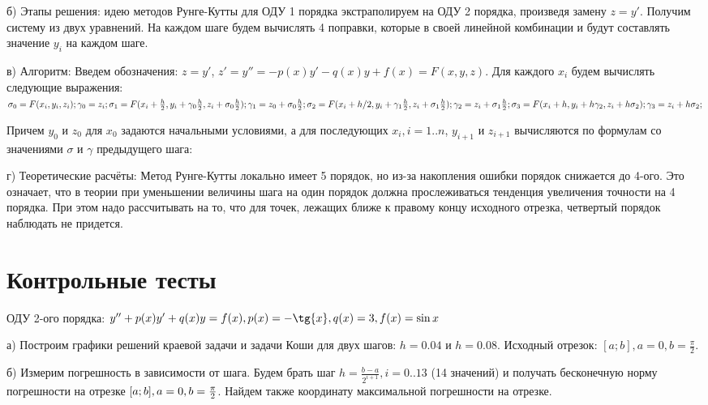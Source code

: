 \documentclass{article}
\begin{document}
	
	б) Этапы решения: идею методов Рунге-Кутты для ОДУ 1 порядка экстраполируем на ОДУ 2 порядка, произведя замену $z = y'$. Получим систему из двух уравнений. На каждом шаге будем вычислять 4 поправки, которые в своей линейной комбинации и будут составлять значение $y_i$ на каждом шаге.\par
	в) Алгоритм: Введем обозначения: $z = y'$, $z' = y'' = -p(x)y' - q(x)y + f(x) = F(x, y, z)$. Для каждого $x_i$ будем вычислять следующие выражения:\\
	$       \sigma_0 = F(x_i, y_i, z_i);\\
	\gamma_0 = z_i;\\ \\
	\sigma_1 = F(x_i + \frac{h}{2}, y_i + \gamma_0\frac{h}{2}, z_i + \sigma_0\frac{h}{2});\\
	\gamma_1 = z_0 + \sigma_0\frac{h}{2};\\ \\
	\sigma_2 = F(x_i + h/2, y_i + \gamma_1\frac{h}{2}, z_i + \sigma_1\frac{h}{2});\\
	\gamma_2 = z_i + \sigma_1\frac{h}{2};\\ \\
	\sigma_3 = F(x_i + h, y_i + h\gamma_2, z_i + h\sigma_2);\\
	\gamma_3 = z_i + h\sigma_2;$\par\par
	Причем $y_0$ и $z_0$ для $x_0$ задаются начальными условиями, а для последующих $x_i, i = 1..n$, $y_{i+1}$ и $z_{i+1}$ вычисляются по формулам со значениями $\sigma$ и $\gamma$ предыдущего шага: 

	
	
	г) Теоретические расчёты: Метод Рунге-Кутты локально имеет 5 порядок, но из-за накопления ошибки порядок снижается до 4-ого. Это означает, что в теории при уменьшении величины шага на один порядок должна прослеживаться тенденция увеличения точности на 4 порядка. При этом надо рассчитывать на то, что для точек, лежащих ближе к правому концу исходного отрезка, четвертый порядок наблюдать не придется.
	

	
	\section{Контрольные тесты}
	ОДУ 2-ого порядка: $y'' + p(x)y' + q(x)y = f(x), p(x) = - \tg{x}, q(x) = 3, f(x) = \sin{x}$\par
	а) Построим графики решений краевой задачи и задачи Коши для двух шагов: $h = 0.04$ и $h = 0.08$. Исходный отрезок: $[a;b], a = 0, b = \frac{\pi}{2}$. \par
	б) Измерим погрешность в зависимости от шага. Будем брать шаг $h = \frac{b-a}{2^{i+1}}, i = 0..13$ (14 значений) и получать бесконечную норму погрешности на отрезке $[a;b],\\ a = 0, b = \frac{\pi}{2}$. Найдем также координату максимальной погрешности на отрезке.
	
\end{document}
